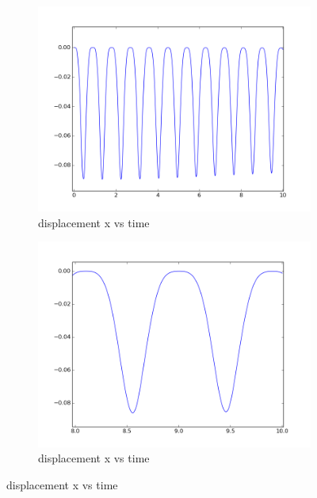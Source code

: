 \begin{figure}[!ht]
\begin{subfigure}[b]{0.5\linewidth}
\includegraphics[width=\linewidth]{figures/CSM3/CSM3_Full_x}\caption{displacement x vs time}
\end{subfigure}
\begin{subfigure}[b]{0.5\linewidth}
\includegraphics[width=\linewidth]{figures/CSM3/CSM3_2_x}\caption{displacement x vs time}
\end{subfigure}
\end{figure}
